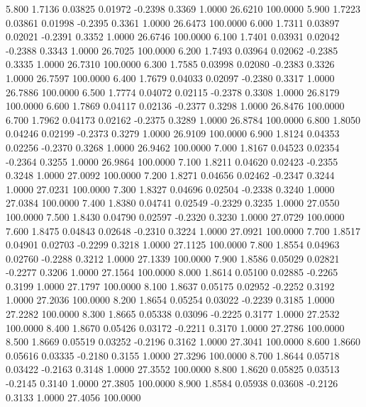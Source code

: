    5.800   1.7136   0.03825   0.01972  -0.2398   0.3369   1.0000  26.6210 100.0000
   5.900   1.7223   0.03861   0.01998  -0.2395   0.3361   1.0000  26.6473 100.0000
   6.000   1.7311   0.03897   0.02021  -0.2391   0.3352   1.0000  26.6746 100.0000
   6.100   1.7401   0.03931   0.02042  -0.2388   0.3343   1.0000  26.7025 100.0000
   6.200   1.7493   0.03964   0.02062  -0.2385   0.3335   1.0000  26.7310 100.0000
   6.300   1.7585   0.03998   0.02080  -0.2383   0.3326   1.0000  26.7597 100.0000
   6.400   1.7679   0.04033   0.02097  -0.2380   0.3317   1.0000  26.7886 100.0000
   6.500   1.7774   0.04072   0.02115  -0.2378   0.3308   1.0000  26.8179 100.0000
   6.600   1.7869   0.04117   0.02136  -0.2377   0.3298   1.0000  26.8476 100.0000
   6.700   1.7962   0.04173   0.02162  -0.2375   0.3289   1.0000  26.8784 100.0000
   6.800   1.8050   0.04246   0.02199  -0.2373   0.3279   1.0000  26.9109 100.0000
   6.900   1.8124   0.04353   0.02256  -0.2370   0.3268   1.0000  26.9462 100.0000
   7.000   1.8167   0.04523   0.02354  -0.2364   0.3255   1.0000  26.9864 100.0000
   7.100   1.8211   0.04620   0.02423  -0.2355   0.3248   1.0000  27.0092 100.0000
   7.200   1.8271   0.04656   0.02462  -0.2347   0.3244   1.0000  27.0231 100.0000
   7.300   1.8327   0.04696   0.02504  -0.2338   0.3240   1.0000  27.0384 100.0000
   7.400   1.8380   0.04741   0.02549  -0.2329   0.3235   1.0000  27.0550 100.0000
   7.500   1.8430   0.04790   0.02597  -0.2320   0.3230   1.0000  27.0729 100.0000
   7.600   1.8475   0.04843   0.02648  -0.2310   0.3224   1.0000  27.0921 100.0000
   7.700   1.8517   0.04901   0.02703  -0.2299   0.3218   1.0000  27.1125 100.0000
   7.800   1.8554   0.04963   0.02760  -0.2288   0.3212   1.0000  27.1339 100.0000
   7.900   1.8586   0.05029   0.02821  -0.2277   0.3206   1.0000  27.1564 100.0000
   8.000   1.8614   0.05100   0.02885  -0.2265   0.3199   1.0000  27.1797 100.0000
   8.100   1.8637   0.05175   0.02952  -0.2252   0.3192   1.0000  27.2036 100.0000
   8.200   1.8654   0.05254   0.03022  -0.2239   0.3185   1.0000  27.2282 100.0000
   8.300   1.8665   0.05338   0.03096  -0.2225   0.3177   1.0000  27.2532 100.0000
   8.400   1.8670   0.05426   0.03172  -0.2211   0.3170   1.0000  27.2786 100.0000
   8.500   1.8669   0.05519   0.03252  -0.2196   0.3162   1.0000  27.3041 100.0000
   8.600   1.8660   0.05616   0.03335  -0.2180   0.3155   1.0000  27.3296 100.0000
   8.700   1.8644   0.05718   0.03422  -0.2163   0.3148   1.0000  27.3552 100.0000
   8.800   1.8620   0.05825   0.03513  -0.2145   0.3140   1.0000  27.3805 100.0000
   8.900   1.8584   0.05938   0.03608  -0.2126   0.3133   1.0000  27.4056 100.0000
